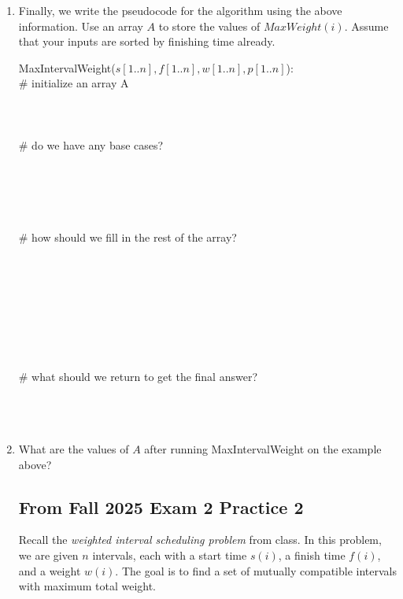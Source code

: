 \documentclass[11pt]{article}
\begin{document}
\begin{enumerate}
\item Finally, we write the pseudocode for the algorithm using the above information.
Use an array $A$ to store the values of $MaxWeight(i)$. Assume that your
inputs are sorted by finishing time already.


   \begin{algo}
    MaxIntervalWeight($s[1..n], f[1..n], w[1..n], p[1..n]$):\+\\
    \# initialize an array A\\
    \\
    \\
    \\
    \# do we have any base cases?\\
    \\
    \\
    \\
    \\
    \\
    \# how should we fill in the rest of the array?\\
    \\
    \\
    \\
    \\
    \\
    \\
    \\
    \\
    \# what should we return to get the final answer?\\
    \\
    \\
    \\
    \hspace{5in}
    \end{algo}

\item What are the values of $A$ after running MaxIntervalWeight on the example above?


\newpage

\subsection*{From Fall 2025 Exam 2 Practice 2}
Recall the \emph{weighted interval scheduling problem} from class. In this
problem, we are given $n$ intervals, each with a start time $s(i)$, a finish
time $f(i)$, and a weight $w(i)$. The goal is to find a set of mutually
compatible intervals with maximum total weight.


\end{enumerate}
\end{document}

